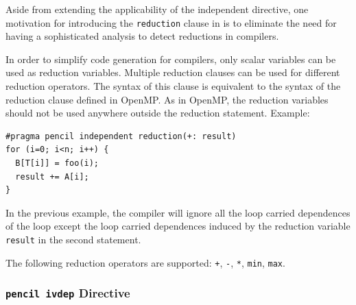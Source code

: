   Aside from extending the applicability of the independent directive, one
  motivation for introducing the \lstinline!reduction!
  clause in \pencil is to eliminate the need for having a sophisticated
  analysis to detect reductions in \pencil compilers.

  In order to simplify code generation for \pencil compilers, only scalar
  variables can be used as reduction variables.
  Multiple reduction clauses can be used for different reduction operators.
  The syntax of this clause is equivalent to the syntax of the reduction clause
  defined in OpenMP.  As in OpenMP, the reduction variables should not
  be used anywhere outside the reduction statement.  Example:
  \begin{lstlisting}[language=pencil]
#pragma pencil independent reduction(+: result)
for (i=0; i<n; i++) {
  B[T[i]] = foo(i);
  result += A[i];
}
  \end{lstlisting}
  In the previous example, the compiler will ignore all the loop carried
  dependences of the loop except the loop carried dependences induced by
  the reduction variable \lstinline!result! in the second statement.

The following reduction operators are supported:
\lstinline!+!, \lstinline!-!, \lstinline!*!, \lstinline!min!, \lstinline!max!.


\subsubsection{\lstinline!pencil ivdep! Directive\label{sec:ivdep}}


